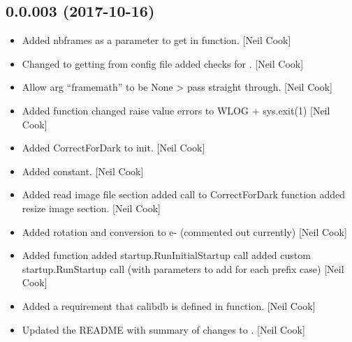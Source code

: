 \documentclass[a4paper,10pt,english]{report}
\begin{document}
\subsection{0.0.003 (2017-10-16)}
\label{\detokenize{misc/changelog:id548}}\begin{itemize}
\item {} 
Added nbframes as a parameter to get in  function. {[}Neil
Cook{]}

\item {} 
Changed  to getting from config file added checks for
. {[}Neil Cook{]}

\item {} 
Allow  arg “framemath” to be None \textendash{}\textgreater{} pass straight
through. {[}Neil Cook{]}

\item {} 
Added  function changed raise value errors to WLOG +
sys.exit(1) {[}Neil Cook{]}

\item {} 
Added CorrectForDark to init. {[}Neil Cook{]}

\item {} 
Added  constant. {[}Neil Cook{]}

\item {} 
Added read image file section added call to CorrectForDark function
added resize image section. {[}Neil Cook{]}

\item {} 
Added rotation and conversion to e- (commented out currently) {[}Neil
Cook{]}

\item {} 
Added  function added startup.RunInitialStartup call added
custom startup.RunStartup call (with parameters to add for each prefix
case) {[}Neil Cook{]}

\item {} 
Added a requirement that calibdb is defined in  function.
{[}Neil Cook{]}

\item {} 
Updated the README with summary of changes to .
{[}Neil Cook{]}

\end{itemize}
\end{document}
